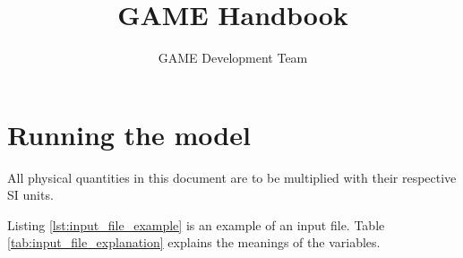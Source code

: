 \documentclass{article}
\title{GAME Handbook}
\author{GAME Development Team}
\date{}
\begin{document}
\maketitle

\section{Running the model}
\label{sec:running_the_model}

All physical quantities in this document are to be multiplied with their respective SI units.

\label{lst:input_file_example}

Listing \ref{lst:input_file_example} is an example of an input file. Table \ref{tab:input_file_explanation} explains the meanings of the variables.
\end{document}
